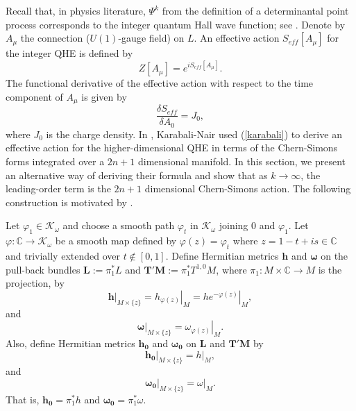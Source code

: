 \documentclass[12pt,reqno,a4paper]{amsart}
\numberwithin{equation}{section}
\theoremstyle{remark}
\theoremstyle{dotless}
\begin{document}
Recall that, in physics literature, $\Psi^k$ from the definition of a determinantal point process corresponds to the integer quantum Hall wave function; see \cite{tong2016lectures,klevtsov2016geometry}. Denote by $A_\mu$ the connection ($U(1)$-gauge field) on $L$. An effective action $S_{eff}[A_\mu]$ for the integer QHE is defined by
\begin{equation*}
Z[A_\mu]=e^{iS_{eff}[A_\mu]}.
\end{equation*}
The functional derivative of the effective action with respect to the time component of $A_\mu$ is given by
\begin{equation}\label{karabali}
\frac{\delta S_{eff}}{\delta A_0} = J_0,
\end{equation}
where $J_0$ is the charge density. In \cite[(26), (41)]{karabali2016geometry}, Karabali-Nair used (\ref{karabali}) to derive an effective action for the higher-dimensional QHE in terms of the Chern-Simons forms integrated over a $2n+1$ dimensional manifold. In this section, we present an alternative way of deriving their formula and show that as $k\rightarrow\infty$, the leading-order term is the $2n+1$ dimensional Chern-Simons action. The following construction is motivated by \cite[Proposition 1.4]{tian1999bott}.

Let $\varphi_1 \in \mathcal{K}_\omega$ and choose a smooth path $\varphi_t$ in $\mathcal{K}_\omega$ joining $0$ and $\varphi_1$. Let $\varphi : \mathbb{C} \rightarrow \mathcal{K}_\omega$ be a smooth map defined by $\varphi(z)=\varphi_t$ where $z=1-t+is\in\mathbb{C}$ and trivially extended over $t\notin [0,1]$. Define Hermitian metrics $\mathbf{h}$ and $\boldsymbol{\omega}$ on the pull-back bundles $\mathbf{L}:=\pi_1^*L$ and $\mathbf{T'M}:=\pi_1^*T^{1,0}M$, where $\pi_1 : M\times\mathbb{C}\rightarrow M$ is the projection, by
\begin{equation*}
\left.\mathbf{h}\right|_{M\times\{z\}}=\left.h_{\varphi(z)}\right|_M=\left.he^{-\varphi(z)}\right|_M,
\end{equation*}
and
\begin{equation*}
\left.\boldsymbol{\omega}\right|_{M\times\{z\}}=\left.\omega_{\varphi(z)}\right|_M.
\end{equation*}
Also, define Hermitian metrics $\mathbf{h_0}$ and $\boldsymbol{\omega_0}$ on $\mathbf{L}$ and $\mathbf{T'M}$ by
\begin{equation*}
\left.\mathbf{h_0}\right|_{M\times\{z\}}=\left.h\right|_M,
\end{equation*}
and
\begin{equation*}
\left.\boldsymbol{\omega_0}\right|_{M\times\{z\}}=\left.\omega\right|_M.
\end{equation*}
That is, $\mathbf{h_0}=\pi_1^*h$ and $\boldsymbol{\omega_0}=\pi_1^*\omega$.
\end{document}
